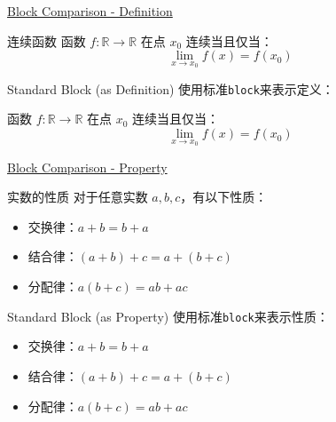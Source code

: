 \documentclass[11pt,aspectratio=43,xcolor={dvipsnames},hyperref={pdftex,pdfpagemode=UseNone,hidelinks,pdfdisplaydoctitle=true},usepdftitle=false]{ctexbeamer}
\begin{document}
\begin{frame}{\underline{Block Comparison - Definition}}
  \begin{chddefinition}{连续函数}
    函数 $f: \mathbb{R} \to \mathbb{R}$ 在点 $x_0$ 连续当且仅当：
    $$\lim_{x \to x_0} f(x) = f(x_0)$$
  \end{chddefinition}
  
  \vspace{0.3cm}
  
  \begin{block}{Standard Block (as Definition)}
    使用标准\texttt{block}来表示定义：
    
    函数 $f: \mathbb{R} \to \mathbb{R}$ 在点 $x_0$ 连续当且仅当：
    $$\lim_{x \to x_0} f(x) = f(x_0)$$
  \end{block}
\end{frame}

\begin{frame}{\underline{Block Comparison - Property}}
  \begin{chdproperty}{实数的性质}
    对于任意实数 $a, b, c$，有以下性质：
    \begin{itemize}
      \item 交换律：$a + b = b + a$
      \item 结合律：$(a + b) + c = a + (b + c)$
      \item 分配律：$a(b + c) = ab + ac$
    \end{itemize}
  \end{chdproperty}
  
  \vspace{0.3cm}
  
  \begin{block}{Standard Block (as Property)}
    使用标准\texttt{block}来表示性质：
    \begin{itemize}
      \item 交换律：$a + b = b + a$
      \item 结合律：$(a + b) + c = a + (b + c)$
      \item 分配律：$a(b + c) = ab + ac$
    \end{itemize}
  \end{block}
\end{frame}
\end{document}
